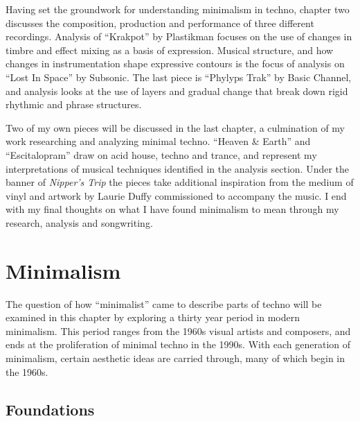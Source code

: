 \documentclass[12pt,twoside]{reedthesis}
\begin{document}
Having set the groundwork for understanding minimalism in techno, chapter two discusses the composition, production and performance of three different recordings. Analysis of ``Krakpot'' by Plastikman focuses on the use of changes in timbre and effect mixing as a basis of expression. Musical structure, and how changes in instrumentation shape expressive contours is the focus of analysis on ``Lost In Space'' by Subsonic. The last piece is ``Phylyps Trak'' by Basic Channel, and analysis looks at the use of layers and gradual change that break down rigid rhythmic and phrase structures.

Two of my own pieces will be discussed in the last chapter, a culmination of my work researching and analyzing minimal techno. ``Heaven {\&} Earth'' and ``Escitalopram'' draw on acid house, techno and trance, and represent my interpretations of musical techniques identified in the analysis section. Under the banner of \emph{Nipper's Trip} the pieces take additional inspiration from the medium of vinyl and artwork by Laurie Duffy commissioned to accompany the music. I end with my final thoughts on what I have found minimalism to mean through my research, analysis and songwriting.




\chapter{Minimalism}

The question of how ``minimalist'' came to describe parts of techno will be examined in this chapter by exploring a thirty year period in modern minimalism. This period ranges from the 1960s visual artists and composers, and ends at the proliferation of minimal techno in the 1990s. With each generation of minimalism, certain aesthetic ideas are carried through, many of which begin in the 1960s.

\section{Foundations}
\end{document}
